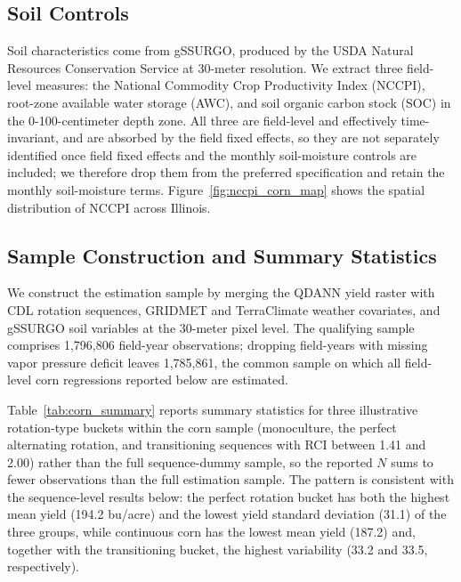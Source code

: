 \documentclass[12pt,letterpaper]{article}
\theoremstyle{remark}
\theoremstyle{remark}
\theoremstyle{plain}
\theoremstyle{definition}
\begin{document}
\subsection{\label{subsec:soil_controls}Soil Controls}
Soil characteristics come from gSSURGO, produced by the USDA Natural Resources Conservation Service at 30-meter resolution. We extract three field-level measures: the National Commodity Crop Productivity Index (NCCPI), root-zone available water storage (AWC), and soil organic carbon stock (SOC) in the 0-100-centimeter depth zone. All three are field-level and effectively time-invariant, and are absorbed by the field fixed effects, so they are not separately identified once field fixed effects and the monthly soil-moisture controls are included; we therefore drop them from the preferred specification and retain the monthly soil-moisture terms. Figure~\ref{fig:nccpi_corn_map} shows the spatial distribution of NCCPI across Illinois.

\subsection{\label{subsec:smaple_const}Sample Construction and Summary Statistics}
We construct the estimation sample by merging the QDANN yield raster with CDL rotation sequences, GRIDMET and TerraClimate weather covariates, and gSSURGO soil variables at the 30-meter pixel level. The qualifying sample comprises 1,796,806 field-year observations; dropping field-years with missing vapor pressure deficit leaves 1,785,861, the common sample on which all field-level corn regressions reported below are estimated.


\vspace{-1ex}

Table~\ref{tab:corn_summary} reports summary statistics for three illustrative rotation-type buckets within the corn sample (monoculture, the perfect alternating rotation, and transitioning sequences with RCI between 1.41 and 2.00) rather than the full sequence-dummy sample, so the reported $N$ sums to fewer observations than the full estimation sample. The pattern is consistent with the sequence-level results below: the perfect rotation bucket has both the highest mean yield (194.2 bu/acre) and the lowest yield standard deviation (31.1) of the three groups, while continuous corn has the lowest mean yield (187.2) and, together with the transitioning bucket, the highest variability (33.2 and 33.5, respectively).
\end{document}
